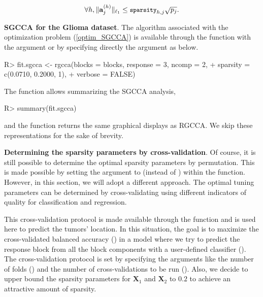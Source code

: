 \documentclass[
]{jss}
\begin{document}
\begin{equation}
\forall h, \Vert \mathbf{a}_j^{(h)} \Vert_{\ell_1} \leq \small{\texttt{sparsity}}_{h,j} \sqrt{p_j}.
\end{equation}

\textbf{SGCCA for the Glioma dataset}. The algorithm associated with the
optimization problem (\ref{optim_SGCCA}) is available through the
 function with the argument  or by
specifying directly the  argument as below.

\footnotesize

\begin{CodeChunk}
\begin{CodeInput}
R> fit.sgcca <- rgcca(blocks = blocks, response = 3, ncomp = 2,
+                    sparsity = c(0.0710, 0.2000, 1),
+                    verbose = FALSE)
\end{CodeInput}
\end{CodeChunk}

\normalsize

The  function allows summarizing the SGCCA analysis,

\footnotesize

\begin{CodeChunk}
\begin{CodeInput}
R> summary(fit.sgcca)
\end{CodeInput}
\end{CodeChunk}

\normalsize

and the  function returns the same graphical displays as
RGCCA. We skip these representations for the sake of brevity.

\textbf{Determining the sparsity parameters by cross-validation}. Of
course, it is still possible to determine the optimal sparsity
parameters by permutation. This is made possible by setting the
 argument to  (instead of )
within the  function. However, in this
section, we will adopt a different approach. The optimal tuning
parameters can be determined by cross-validating using different
indicators of quality for classification and regression.

This cross-validation protocol is made available through the
 function and is used here to predict the tumors'
location. In this situation, the goal is to maximize the cross-validated
balanced accuracy () in a model
where we try to predict the response block from all the block components
with a user-defined classifier (). The
cross-validation protocol is set by specifying the arguments like the
number of folds () and the number of cross-validations to be run
(). Also, we decide to upper bound the sparsity parameters
for \(\mathbf X_1\) and \(\mathbf X_2\) to \(0.2\) to achieve an
attractive amount of sparsity.
\end{document}
